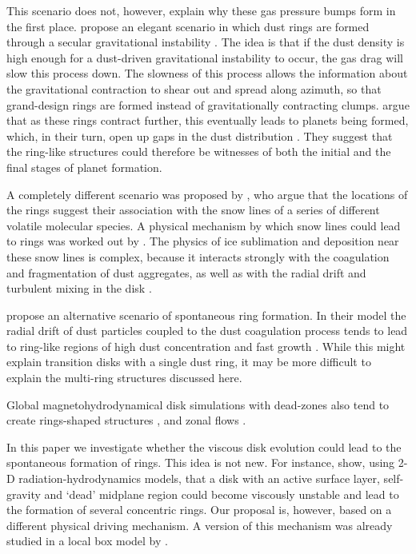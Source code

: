 \documentclass{aa}
\begin{document}
This scenario does not, however, explain why these gas pressure bumps form
in the first place. \cite{2014ApJ...794...55T, 2016AJ....152..184T} propose an
elegant scenario in which dust rings are formed through a secular gravitational
instability \citep{2000orem.book...75W}. The idea is that if the dust density is
high enough for a dust-driven gravitational instability to occur, the gas drag
will slow this process down. The slowness of this process allows the information
about the gravitational contraction to shear out and spread along azimuth, so
that grand-design rings are formed instead of gravitationally contracting
clumps.  \citet{2016AJ....152..184T} argue that as these rings contract further,
this eventually leads to planets being formed, which, in their turn, open up
gaps in the dust distribution \citep{2004A&A...425L...9P}. They suggest that the
ring-like structures could therefore be witnesses of both the initial and the
final stages of planet formation.

A completely different scenario was proposed by \citet{2015ApJ...806L...7Z}, who
argue that the locations of the rings suggest their association with the snow
lines of a series of different volatile molecular species. A physical mechanism
by which snow lines could lead to rings was worked out by
\citet{2016ApJ...821...82O}. The physics of ice sublimation and deposition near
these snow lines is complex, because it interacts strongly with the coagulation
and fragmentation of dust aggregates, as well as with the radial drift and
turbulent mixing in the disk \citep[e.g.][]{2017A&A...600A.140S}.

\citet{2017MNRAS.467.1984G} propose an alternative scenario of spontaneous ring
formation. In their model the radial drift of dust particles coupled to the dust
coagulation process tends to lead to ring-like regions of high dust
concentration and fast growth \citep[see also][]{2016A&A...594A.105D}.  While
this might explain transition disks with a single dust ring, it may be more
difficult to explain the multi-ring structures discussed here.

Global magnetohydrodynamical disk simulations with dead-zones also tend to
create rings-shaped structures \citep{2015A&A...574A..68F}, and zonal flows
\citep{2009ApJ...697.1269J}.

In this paper we investigate whether the viscous disk evolution could lead to
the spontaneous formation of rings. This idea is not new. For instance,
\citet{2005MNRAS.362..361W} show, using 2-D radiation-hydrodynamics models, that
a disk with an active surface layer, self-gravity and `dead' midplane region
could become viscously unstable and lead to the formation of several concentric
rings. Our proposal is, however, based on a different physical driving
mechanism. A version of this mechanism was already studied in a local box model
by \citet{2011IAUS..274...50J}.
\end{document}
